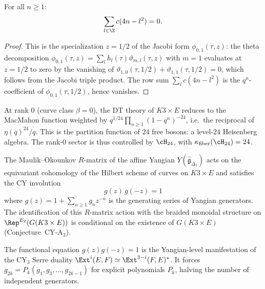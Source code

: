 \begin{proposition}
\label{prop:k3e-row-sum}
For all $n \geq 1$:
\[
 \sum_{l \in \Z} c(4n - l^2) = 0.
\]
\ClaimStatusProvedHere
\end{proposition}

\begin{proof}
This is the specialization $z = 1/2$ of the Jacobi form $\phi_{0,1}(\tau, z)$: the theta decomposition $\phi_{0,1}(\tau,z) = \sum_l h_l(\tau) \vartheta_{m,l}(\tau,z)$ with $m=1$ evaluates at $z = 1/2$ to zero by the vanishing of $\vartheta_{1,0}(\tau, 1/2) + \vartheta_{1,1}(\tau, 1/2) = 0$, which follows from the Jacobi triple product. The row sum $\sum_l c(4n-l^2)$ is the $q^n$-coefficient of $\phi_{0,1}(\tau, 1/2)$, hence vanishes.
\end{proof}

\begin{remark}
\label{rem:k3e-rank0}
At rank $0$ (curve class $\beta = 0$), the DT theory of $K3 \times E$ reduces to the MacMahon function weighted by $q^{1/24} \prod_{n \geq 1}(1 - q^n)^{-24}$, i.e.\ the reciprocal of $\eta(q)^{24} / q$. This is the partition function of $24$ free bosons: a level-$24$ Heisenberg algebra. The rank-$0$ sector is thus controlled by $\cH_{24}$, with $\kappa_{\mathrm{fiber}}(\cH_{24}) = 24$.
\end{remark}

\begin{theorem}
\label{thm:k3e-yangian}
\ClaimStatusProvedElsewhere
The Maulik--Okounkov $R$-matrix of the affine Yangian $Y(\widehat{\mathfrak{g}}_{\Delta_5})$ acts on the equivariant cohomology of the Hilbert scheme of curves on $K3 \times E$ and satisfies the CY involution
\[
 g(z) \, g(-z) = 1
\]
where $g(z) = 1 + \sum_{n \geq 1} g_n z^{-n}$ is the generating series of Yangian generators. The identification of this $R$-matrix action with the braided monoidal structure on $\Rep^{E_2}(G(K3 \times E))$ is conditional on the existence of $G(K3 \times E)$ (Conjecture~CY-A$_3$).
\end{theorem}

\begin{remark}[CY involution]
\label{rem:k3e-cy-involution}
The functional equation $g(z)g(-z) = 1$ is the Yangian-level manifestation of the CY$_3$ Serre duality $\Ext^i(E,F) \simeq \Ext^{3-i}(F,E)^*$. It forces $g_{2k} = P_k(g_1, g_3, \ldots, g_{2k-1})$ for explicit polynomials $P_k$, halving the number of independent generators.
\end{remark}

